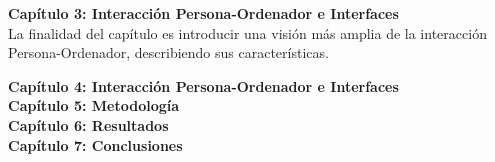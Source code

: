 \textbf{Capítulo 3: Interacción Persona-Ordenador e Interfaces}\\
La finalidad del capítulo es introducir una visión más amplia de la interacción Persona-Ordenador, describiendo sus características.

\textbf{Capítulo 4: Interacción Persona-Ordenador e Interfaces}\\


\textbf{Capítulo 5: Metodología}\\

\textbf{Capítulo 6: Resultados}\\

\textbf{Capítulo 7: Conclusiones}\\




